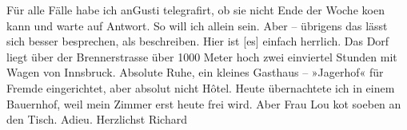 \pstart
           Für alle Fälle habe ich \introOben{}an\introOben{}{ }Gusti telegrafirt, ob sie nicht
               Ende der Woche ko{\geminationm}en kann und warte auf Antwort. So will
               ich allein sein. Aber – übrigens das lässt sich besser besprechen, als beschreiben.
               Hier ist {\pb}{[}es{]} einfach herrlich. Das Dorf liegt über der Brennerstrasse über 1000 Meter hoch zwei einviertel Stunden mit
               Wagen von Innsbruck. Absolute Ruhe, ein kleines
               Gasthaus – »Jagerhof« für Fremde eingerichtet,
               aber absolut nicht Hôtel. Heute übernachtete ich in einem Bauernhof, weil mein Zimmer
               erst heute frei wird. Aber Frau Lou ko{\geminationm}t soeben an den Tisch. Adieu.\pend
           \pstart Herzlichst \spacefill\mbox{Richard}\pend{}\endnumbering{}  
      
